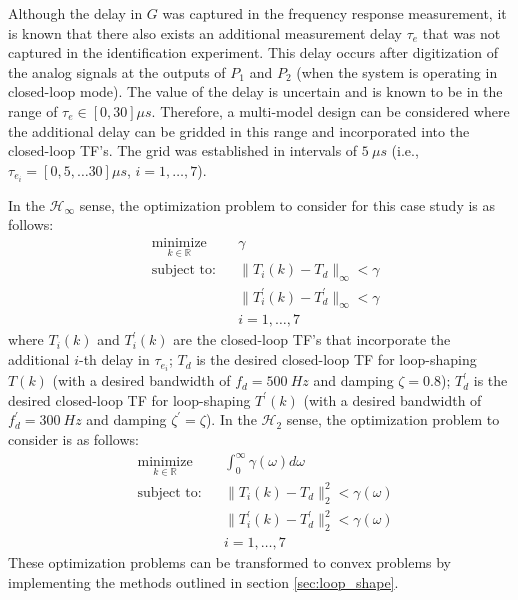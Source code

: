\documentclass[a4paper, 10pt, conference]{ieeeconf}
\begin{document}
Although the delay in $G$ was captured in the frequency response measurement, it is known that there also exists an additional measurement delay $\tau_e$ that was not captured in the identification experiment. This delay occurs after digitization of the analog signals at the outputs of $P_1$ and $P_2$ (when the system is operating in closed-loop mode). The value of the delay is uncertain and is known to be in the range of $\tau_e \in [0,30]\mu s$. Therefore, a multi-model design can be considered where the additional delay can be gridded in this range and incorporated into the closed-loop TF's. The grid was established in intervals of $5 \: \mu s$ (i.e., $\tau_{e_i} = [0,5,\ldots30] \mu s$, $i = 1,\ldots,7$).  

In the $\mathcal{H}_{\infty}$ sense, the optimization problem to consider for this case study is as follows:
 \begin{equation} \label{eq:case_study_opt}
\begin{aligned}
& \underset{ k \in \mathbb{R}}{\text{minimize}}
& & \gamma  \\
& \text{subject to:} & & \|T_i(k)-T_d\|_{\infty}< \gamma \\
& &  &\|T_i^{\prime}(k)-T_d^{\prime}\|_{\infty}< \gamma \\ 
& & & i = 1,\ldots,7
\end{aligned}
\end{equation}
where $T_i(k)$ and $T_i^{\prime}(k)$ are the closed-loop TF's that incorporate the additional $i$-th delay in $\tau_{e_i}$; $T_d$ is the desired closed-loop TF for loop-shaping $T(k)$ (with a desired bandwidth of $f_d = 500 \: Hz$ and damping $\zeta = 0.8$); $T_d^{\prime}$ is the desired closed-loop TF for loop-shaping $T^{\prime}(k)$ (with a desired bandwidth of $f_d^{\prime} = 300 \: Hz$ and damping $\zeta^{\prime} = \zeta$). In the $\mathcal{H}_2$ sense, the optimization problem to consider is as follows:
\begin{equation} \label{eq:case_study_opt_2}
\begin{aligned}
& \underset{ k \in \mathbb{R}}{\text{minimize}}
& & \int_0^{\infty} \gamma(\omega) d\omega  \\
& \text{subject to:} & & \|T_i(k)-T_d\|_2^2< \gamma(\omega) \\
& &  &\|T_i^{\prime}(k)-T_d^{\prime}\|_2^2< \gamma(\omega) \\ 
& & & i = 1,\ldots,7
\end{aligned}
\end{equation}
These optimization problems can be transformed to convex problems by implementing the methods outlined in section \ref{sec:loop_shape}. 
\end{document}
